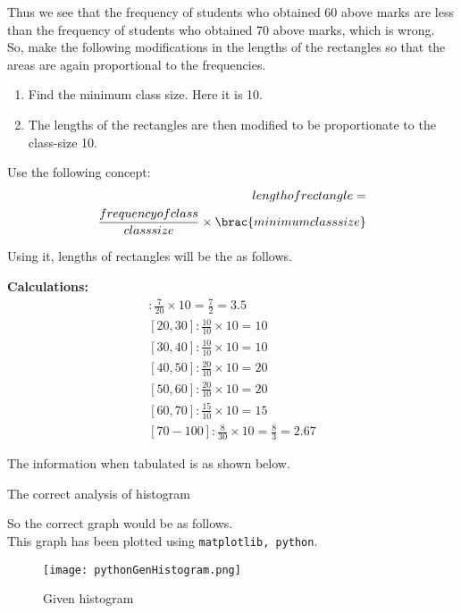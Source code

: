 \documentclass[journal, 12pt, twocolumn]{IEEEtran}
\newcommand{\calc}{\noindent \textbf{Calculations: }}
\numberwithin{equation}{subsection}
\begin{document}
Thus we see that the frequency of students who obtained 60 above marks are less than the frequency of students who obtained 70 above marks, which is wrong. \\
So, make the following modifications in the lengths of the rectangles so that the areas are again proportional to the frequencies.
\begin{enumerate}
    \item Find the minimum class size. Here it is 10. 
    \item The lengths of the rectangles are then modified to be proportionate to the
class-size 10.
\end{enumerate}

Use the following concept:
\begin{align}
	\begin{split}
	    length of rectangle =
\\
        \frac{frequency of class}{class size} \times \brac{minimum class size}	\end{split}
\end{align}

Using it, lengths of rectangles will be the as follows.

\calc
\begin{align}
    [0,20] : \frac{7}{20} \times 10 = \frac{7}{2} = 3.5\\
    [20, 30] : \frac{10}{10} \times 10 = 10\\
    [30, 40] : \frac{10}{10} \times 10 = 10\\
    [40, 50] : \frac{20}{10} \times 10 = 20\\ 
    [50, 60] : \frac{20}{10} \times 10 = 20\\
    [60, 70] : \frac{15}{10} \times 10 = 15\\
    [70-100] : \frac{8}{30} \times 10 = \frac{8}{3} = 2.67
\end{align}

The information when tabulated is as shown below.


\begin{table}[ht!]
    \centering
	
	\caption{The correct analysis of histogram}
\end{table}

So the correct graph would be as follows.\\
This graph has been plotted using \texttt{matplotlib, python}.
\begin{figure}[h!]
	\centering
	\texttt{[image: pythonGenHistogram.png]}
	\caption{Given histogram}
	\label{Figure_1}
	\end{figure}
\end{document}
